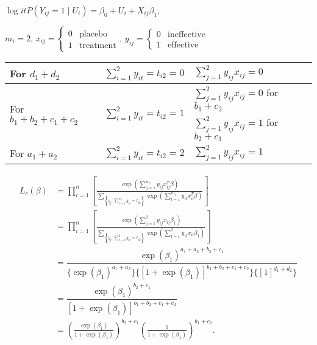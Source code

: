 \documentclass[UTF8,a4paper,10pt]{article}
\begin{document}
$\log i t P\left(Y_{i j}=1 \mid U_i\right)=\beta_0+U_i+X_{i j}\beta_1$,

\(m_i=2\),
\(x_{ij} = \begin{cases}
  0 & \text{placebo}\\
  1 & \text{treatment}
\end{cases}\),
\(y_{ij} = \begin{cases}
  0 & \text{ineffective}\\
  1 & \text{effective}
\end{cases}\)


\begin{table}[H]
  \centering
  \renewcommand{\arraystretch}{1.5} %
  \begin{tabular}{|l|p{}|p{}|}

  \hline
  For $d_1+d_2$ & $\sum_{i=1}^{2} y_{i t} = t_{i 2} = 0$  & $\sum_{j=1}^{2} y_{i j} x_{i j} = 0$ \\
  \hline
  \multirow{2}{*}{For $b_1+b_2+c_1+c_2$} & \multirow{2}{*}{$\sum_{i=1}^{2} y_{i t} = t_{i 2} = 1$ } &  $\sum_{j=1}^{2} y_{i j} x_{i j} = 0$ for $b_1+c_2$  \\
    &  &  $\sum_{j=1}^{2} y_{i j} x_{i j} = 1$ for $b_2+c_1$\\
  \hline
  For $a_1 + a_2$ & $\sum_{i=1}^{2} y_{i t} = t_{i 2} = 2$  & $\sum_{j=1}^{2} y_{i j} x_{i j} = 1$ \\
  \hline
  \end{tabular}

  \end{table}


\begin{align*}
  L_c(\beta) &=\prod_{i=1}^n\left[\frac{\exp \left(\sum_{j=1}^{m_i} y_{i j} x_{i j}^T \beta\right)}{\sum_{\left\{\underset{\sim}{y_i}: \sum_{i=1}^{m_i} y_{i t}=t_{i 2}\right\}} \exp \left(\sum_{l=1}^{m_i} y_{i l} x_{i l}^T \beta\right)}\right]\\
  &=\prod_{i=1}^n\left[\frac{\exp \left(\sum_{j=1}^{2} y_{i j} x_{i j} \beta_{1}\right)}{\sum_{\left\{\underset{\sim}{y_i}: \sum_{i=1}^{2} y_{i t}=t_{i 2}\right\}} \exp \left(\sum_{l=1}^{2} y_{i l} x_{i l} \beta_{1}\right)}\right]\\
  & = \dfrac{\exp(\beta_{1})^{a_1+a_2+b_2+c_1}}{ \{\exp(\beta_{1})^{a_1+a_2}\} \{[1+\exp(\beta_{1})]^{b_1+b_2+c_1+c_2}\} \{[1]^{d_1+d_2}\}}\\
  & = \dfrac{\exp(\beta_{1})^{b_2+c_1}}{ [1+\exp(\beta_{1})]^{b_1+b_2+c_1+c_2}}\\
  & = \left(\frac{\exp \left(\beta_1\right)}{1+\exp \left(\beta_1\right)}\right)^{b_2+c_1}\left(\frac{1}{1+\exp \left(\beta_1\right)}\right)^{b_1+c_2}.
\end{align*}
\end{document}
